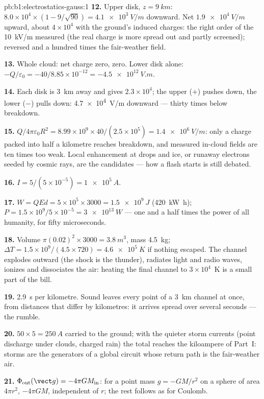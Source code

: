 \begin{solution}{pb:b1:electrostatics-gauss:1}
\textbf{12.} Upper disk, $z = \qty{9}{km}$: $8.0 \times 10^4 \times (1 - 9/\sqrt{90}) =
\qty{4.1e3}{V/m}$ downward. Net $\qty{1.9e4}{V/m}$ upward, about $4 \times 10^4$
with the ground's induced charges: the right order of the \qty{10}{kV/m}
measured (the real charge is more spread out and partly screened);
reversed and a hundred times the fair-weather field.

\textbf{13.} Whole cloud: net charge zero,  zero. Lower disk alone:
$-Q/\varepsilon_0 = -40/8.85 \times 10^{-12} = \qty{-4.5e12}{V.m}$.

\textbf{14.} Each disk is \qty{3}{km} away and gives $2.3 \times 10^4$; the
upper ($+$) pushes down, the lower ($-$) pulls down: \qty{4.7e4}{V/m}
downward --- thirty times below breakdown.

\textbf{15.} $Q/4\pi\varepsilon_0R^2 = 8.99 \times 10^9 \times 40/(2.5 \times 10^5) =
\qty{1.4e6}{V/m}$: only a charge packed into half a kilometre reaches
breakdown, and measured in-cloud fields are ten times too weak. Local
enhancement at drops and ice, or runaway electrons seeded by cosmic
rays, are the candidates --- how a flash starts is still debated.

\textbf{16.} $I = 5/(5 \times 10^{-5}) = \qty{1e5}{A}$.

\textbf{17.} $W = QEd = 5 \times 10^5 \times 3000 = \qty{1.5e9}{J}$ (\qty{420}{kW h});
$P = 1.5 \times 10^9/5 \times 10^{-5} = \qty{3e13}{W}$ --- one and a half times
the power of all humanity, for fifty microseconds.

\textbf{18.} Volume $\pi(0.02)^2 \times 3000 = \qty{3.8}{m^3}$, mass \qty{4.5}{kg};
$\Delta T = 1.5 \times 10^9/(4.5 \times 720) = \qty{4.6e5}{K}$ if nothing escaped.
The channel explodes outward (the shock is the thunder), radiates light
and radio waves, ionizes and dissociates the air: heating the final
channel to $3 \times 10^4$~K is a small part of the bill.

\textbf{19.} \qty{2.9}{s} per kilometre. Sound leaves every point of a
\qty{3}{km} channel at once, from distances that differ by kilometres: it
arrives spread over several seconds --- the rumble.

\textbf{20.} $50 \times 5 = \qty{250}{A}$ carried to the ground; with the
quieter storm currents (point discharge under clouds, charged rain) the
total reaches the kiloampere of Part~I: storms are the generators of a
global circuit whose return path is the fair-weather air.

\textbf{21.} $\Phi_{\text{out}}(\vect g) = -4\pi GM_{\text{in}}$: for a point mass
$g = -GM/r^2$ on a sphere of area $4\pi r^2$,  $-4\pi GM$, independent
of $r$; the rest follows as for Coulomb.


\end{solution}

